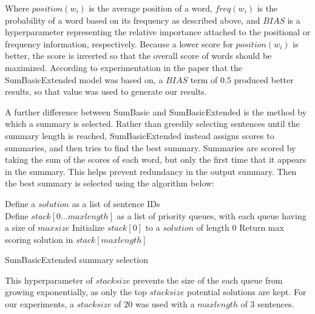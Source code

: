 \documentclass[../writeup.tex]{subfiles}
\begin{document}
Where $position(w_i)$ is the average position of a word, $freq(w_i)$ is the probability of a word based on its frequency as described above, and $BIAS$ is a hyperparameter representing the relative importance attached to the positional or frequency information, respectively.
Because a lower score for $position(w_i)$ is better, the score is inverted so that the overall score of words should be maximized.
According to experimentation in the paper that the SumBasicExtended model was based on, a $BIAS$ term of $0.5$ produced better results, so that value was used to generate our results.\autocite*[]{sumbasic-extended}

A further difference between SumBasic and SumBasicExtended is the method by which a summary is selected.
Rather than greedily selecting sentences until the summary length is reached, SumBasicExtended instead assigns scores to summaries, and then tries to find the best summary.
Summaries are scored by taking the sum of the scores of each word, but only the first time that it appears in the summary.
This helps prevent redundancy in the output summary. Then the best summary is selected using the algorithm below\autocite*[]{sumbasic-extended}:

\begin{algorithm}[H]
    Define a $solution$ as a list of sentence IDs \\
    Define $stack[0\ldots maxlength]$ as a list of priority queues, with each queue having a size of $maxsize$ \;
    Initialize $stack[0]$ to a $solution$ of length 0 \;
    Return max scoring solution in $stack[maxlength]$

    \caption{SumBasicExtended summary selection}
    \label{sam:fig:extended_algorithm}
\end{algorithm}

This hyperparameter of $stacksize$ prevents the size of the each queue from growing exponentially, as only the top $stacksize$ potential solutions are kept.
For our experiments, a $stacksize$ of $20$ was used with a $maxlength$ of $3$ sentences.
\end{document}
